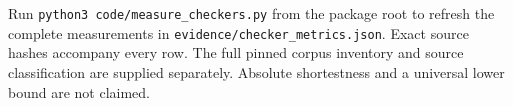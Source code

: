 Run \texttt{python3 code/measure\_checkers.py} from the package root to
refresh the complete measurements in
\texttt{evidence/checker\_metrics.json}. Exact source hashes accompany
every row. The full pinned corpus inventory and source classification
are supplied separately. Absolute shortestness and a universal lower
bound are not claimed.
